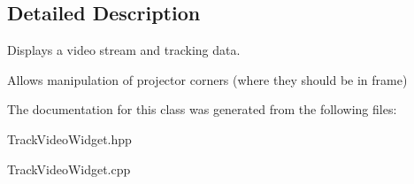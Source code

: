 \subsection{Detailed Description}
Displays a video stream and tracking data. 

Allows manipulation of projector corners (where they should be in frame) 

The documentation for this class was generated from the following files\+:\begin{DoxyCompactItemize}
\item 
Track\+Video\+Widget.\+hpp\item 
Track\+Video\+Widget.\+cpp\end{DoxyCompactItemize}
